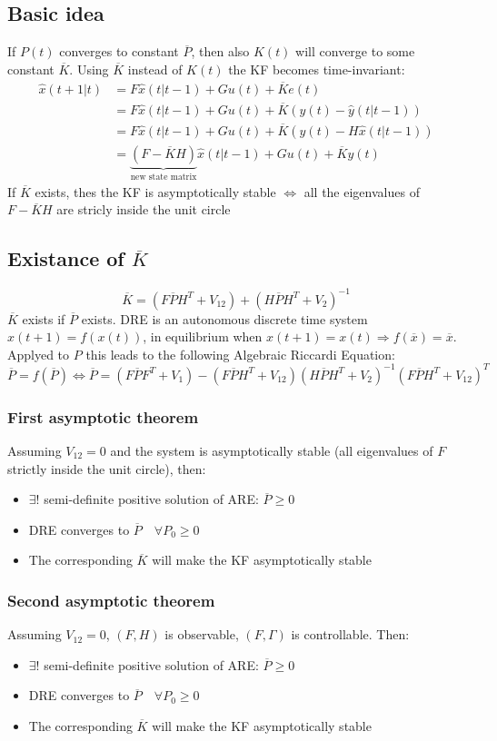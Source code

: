 \documentclass{report}
\begin{document}
\subsection{Basic idea}
If $P(t)$ converges to constant $\overline{P}$, then also $K(t)$ will converge to some constant $\overline{K}$. Using $\overline{K}$ instead of $K(t)$ the KF becomes time-invariant:
\begin{align*}
\hat{x}(t+1|t)&=F\hat{x}(t|t-1)+Gu(t)+\overline{K}e(t)\\
&=F\hat{x}(t|t-1)+Gu(t)+\overline{K}\left(y(t)-\hat{y}(t|t-1)\right)\\
&=F\hat{x}(t|t-1)+Gu(t)+\overline{K}\left(y(t)-H\hat{x}(t|t-1)\right)\\
&=\underbrace{
	\left(F-\overline{K}H\right)
}_{
	\text{new state matrix}
}\hat{x}(t|t-1)+Gu(t)+\overline{K}y(t)
\end{align*}
If $\overline{K}$ exists, thes the KF is asymptotically stable $\iff$ all the eigenvalues of $F-\overline{K}H$ are stricly inside the unit circle
\subsection{Existance of $\overline{K}$}
\[
\overline{K}=
\left(F\overline{P}H^T+V_{12}\right)
+
\left(H\overline{P}H^T+V_2\right)^{-1}
\]
$\overline{K}$ exists if $\overline{P}$ exists. DRE is an autonomous discrete time system $x(t+1)=f(x(t))$, in equilibrium when $x(t+1)=x(t) \Rightarrow f(\overline{x})=\overline{x}$. Applyed to $P$ this leads to the following Algebraic Riccardi Equation:
\[
\overline{P}=f(\overline{P}) \iff
\overline{P}=
\left(
F\overline{P}F^T+V_1
\right)-\left(
F\overline{P}H^T+V_{12}
\right)\left(
H\overline{P}H^T+V_2
\right)^{-1}\left(
F\overline{P}H^T+V_{12}
\right)^T
\]
\subsubsection{First asymptotic theorem}
Assuming $V_{12}=0$ and the system is asymptotically stable (all eigenvalues of $F$ strictly inside the unit circle), then:
\begin{itemize}
\item $\exists!$ semi-definite positive solution of ARE: $\overline{P}\geq 0$
\item DRE converges to $\overline{P}\quad\forall P_0\geq 0$
\item The corresponding $\overline{K}$ will make the KF asymptotically stable
\end{itemize}
\subsubsection{Second asymptotic theorem}
Assuming $V_{12}=0$, $(F,H)$ is observable, $(F,\Gamma)$ is controllable. Then:
\begin{itemize}
\item $\exists!$ semi-definite positive solution of ARE: $\overline{P}\geq 0$
\item DRE converges to $\overline{P}\quad\forall P_0\geq 0$
\item The corresponding $\overline{K}$ will make the KF asymptotically stable
\end{itemize}
\end{document}
